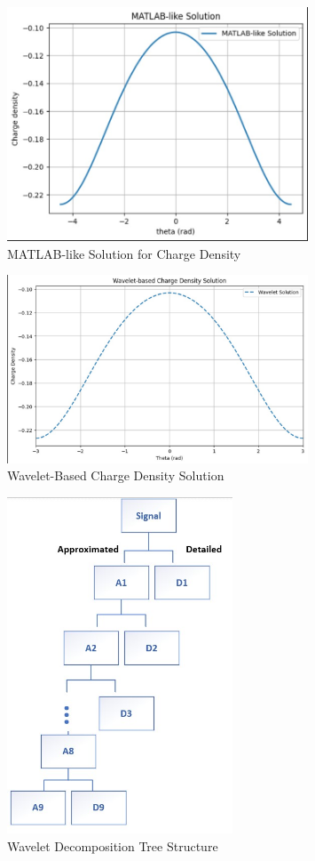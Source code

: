 \documentclass[12pt]{article}
\begin{document}
\begin{figure}[h!]
    \centering
    \includegraphics[width=0.8\textwidth]{1.jpg}
    \caption{MATLAB-like Solution for Charge Density}
\end{figure}

\begin{figure}[h!]
    \centering
    \includegraphics[width=0.8\textwidth]{2.jpg}
    \caption{Wavelet-Based Charge Density Solution}
\end{figure}

\begin{figure}[h!]
    \centering
    \includegraphics[width=0.6\textwidth]{Tree graph.jpg}
    \caption{Wavelet Decomposition Tree Structure}
\end{figure}
\end{document}
